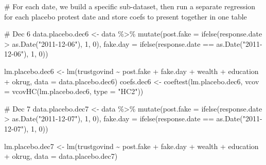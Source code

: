 \documentclass[
  letterpaper,
  DIV=11,
  numbers=noendperiod]{scrartcl}
\newenvironment{Shaded}{\begin{snugshade}}{\end{snugshade}}
\newcommand{\AttributeTok}[1]{\textcolor[rgb]{0.40,0.45,0.13}{#1}}
\newcommand{\CommentTok}[1]{\textcolor[rgb]{0.37,0.37,0.37}{#1}}
\newcommand{\DecValTok}[1]{\textcolor[rgb]{0.68,0.00,0.00}{#1}}
\newcommand{\FunctionTok}[1]{\textcolor[rgb]{0.28,0.35,0.67}{#1}}
\newcommand{\NormalTok}[1]{\textcolor[rgb]{0.00,0.23,0.31}{#1}}
\newcommand{\OtherTok}[1]{\textcolor[rgb]{0.00,0.23,0.31}{#1}}
\newcommand{\SpecialCharTok}[1]{\textcolor[rgb]{0.37,0.37,0.37}{#1}}
\newcommand{\StringTok}[1]{\textcolor[rgb]{0.13,0.47,0.30}{#1}}
\begin{document}
\begin{Shaded}
\begin{Highlighting}[]
\CommentTok{\# For each date, we build a specific sub{-}dataset, then run a separate regression for each placebo protest date and store coefs to present together in one table}

\CommentTok{\# Dec 6}
\NormalTok{data.placebo.dec6 }\OtherTok{\textless{}{-}}\NormalTok{ data }\SpecialCharTok{\%\textgreater{}\%} 
  \FunctionTok{mutate}\NormalTok{(}\AttributeTok{post.fake =} \FunctionTok{ifelse}\NormalTok{(response.date }\SpecialCharTok{\textgreater{}} \FunctionTok{as.Date}\NormalTok{(}\StringTok{"2011{-}12{-}06"}\NormalTok{), }\DecValTok{1}\NormalTok{, }\DecValTok{0}\NormalTok{),}
         \AttributeTok{fake.day =} \FunctionTok{ifelse}\NormalTok{(response.date }\SpecialCharTok{==} \FunctionTok{as.Date}\NormalTok{(}\StringTok{"2011{-}12{-}06"}\NormalTok{), }\DecValTok{1}\NormalTok{, }\DecValTok{0}\NormalTok{))}

\NormalTok{lm.placebo.dec6 }\OtherTok{\textless{}{-}} \FunctionTok{lm}\NormalTok{(trustgovind }\SpecialCharTok{\textasciitilde{}}\NormalTok{ post.fake }\SpecialCharTok{+}\NormalTok{ fake.day }\SpecialCharTok{+}\NormalTok{ wealth }\SpecialCharTok{+}\NormalTok{ education }\SpecialCharTok{+}\NormalTok{ okrug, }
                      \AttributeTok{data =}\NormalTok{ data.placebo.dec6)}
\NormalTok{coefs.dec6 }\OtherTok{\textless{}{-}} \FunctionTok{coeftest}\NormalTok{(lm.placebo.dec6, }\AttributeTok{vcov =} \FunctionTok{vcovHC}\NormalTok{(lm.placebo.dec6, }\AttributeTok{type =} \StringTok{"HC2"}\NormalTok{))}

\CommentTok{\# Dec 7}
\NormalTok{data.placebo.dec7 }\OtherTok{\textless{}{-}}\NormalTok{ data }\SpecialCharTok{\%\textgreater{}\%} 
  \FunctionTok{mutate}\NormalTok{(}\AttributeTok{post.fake =} \FunctionTok{ifelse}\NormalTok{(response.date }\SpecialCharTok{\textgreater{}} \FunctionTok{as.Date}\NormalTok{(}\StringTok{"2011{-}12{-}07"}\NormalTok{), }\DecValTok{1}\NormalTok{, }\DecValTok{0}\NormalTok{),}
         \AttributeTok{fake.day =} \FunctionTok{ifelse}\NormalTok{(response.date }\SpecialCharTok{==} \FunctionTok{as.Date}\NormalTok{(}\StringTok{"2011{-}12{-}07"}\NormalTok{), }\DecValTok{1}\NormalTok{, }\DecValTok{0}\NormalTok{))}

\NormalTok{lm.placebo.dec7 }\OtherTok{\textless{}{-}} \FunctionTok{lm}\NormalTok{(trustgovind }\SpecialCharTok{\textasciitilde{}}\NormalTok{ post.fake }\SpecialCharTok{+}\NormalTok{ fake.day }\SpecialCharTok{+}\NormalTok{ wealth }\SpecialCharTok{+}\NormalTok{ education }\SpecialCharTok{+}\NormalTok{ okrug, }
                      \AttributeTok{data =}\NormalTok{ data.placebo.dec7)}


\end{Highlighting}
\end{Shaded}
\end{document}
